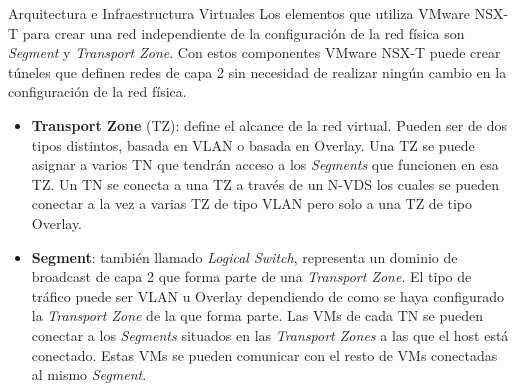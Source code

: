 \begin{subsection}{Arquitectura e Infraestructura Virtuales\cite{CFVirtInfraes}}
Los elementos que utiliza VMware NSX-T para crear una red independiente de la configuración de la red física son \textit{Segment} y \textit{Transport Zone}. Con estos componentes VMware NSX-T puede crear túneles que definen redes de capa 2 sin necesidad de realizar ningún cambio en la configuración de la red física.
\begin{itemize}
  \item \textbf{Transport Zone} (TZ): define el alcance de la red virtual. Pueden ser de dos tipos distintos, basada en VLAN o basada en Overlay. Una TZ se puede asignar a varios TN que tendrán acceso a los \textit{Segments} que funcionen en esa TZ. Un TN se conecta a una TZ a través de un N-VDS los cuales se pueden conectar a la vez a varias TZ de tipo VLAN pero solo a una TZ de tipo Overlay.
  
  \item \textbf{Segment}: también llamado \textit{Logical Switch}, representa un dominio de broadcast de capa 2 que forma parte de una \textit{Transport Zone}. El tipo de tráfico puede ser VLAN u Overlay dependiendo de como se haya configurado la \textit{Transport Zone} de la que forma parte. Las VMs de cada TN se pueden conectar a los \textit{Segments} situados en las \textit{Transport Zones} a las que el host está conectado. Estas VMs se pueden comunicar con el resto de VMs conectadas al mismo \textit{Segment}.
   
\end{itemize}


\end{subsection}
